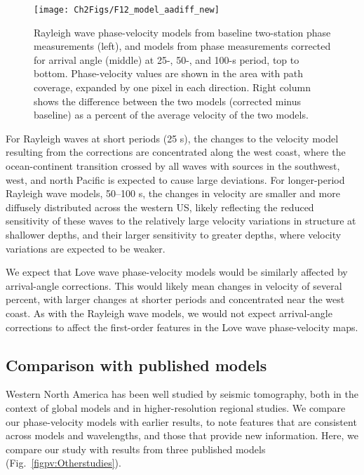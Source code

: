 \documentclass[12pt,oneside]{book}
\begin{document}
\begin{figure} 
\begin{center}
\texttt{[image: Ch2Figs/F12\_model\_aadiff\_new]} 
\caption[Comparison of Rayleigh wave phase-velocity maps from baseline and corrected two-station measurements]{Rayleigh wave phase-velocity models from baseline two-station phase measurements (left), and models from phase measurements corrected for arrival angle (middle) at 25-, 50-, and 100-s period, top to bottom. Phase-velocity values are shown in the area with path coverage, expanded by one pixel in each direction. Right column shows the difference between the two models (corrected minus baseline) as a percent of the average velocity of the two models. }
\label{figpv:pvmodels_R_aadiff}
\end{center}
\end{figure}
%

For Rayleigh waves at short periods (25 s), the changes to the velocity model resulting from the corrections are concentrated along the west coast, where the ocean-continent transition crossed by all waves with sources in the southwest, west, and north Pacific is expected to cause large deviations.  For longer-period Rayleigh wave models, 50\nobreakdash--100 s, the changes in velocity are smaller and more diffusely distributed across the western US, likely reflecting the reduced sensitivity of these waves to the relatively large velocity variations in structure at shallower depths, and their larger sensitivity to greater depths, where velocity variations are expected to be weaker.

We expect that Love wave phase-velocity models would be similarly affected by arrival-angle corrections. This would likely mean changes in velocity of several percent, with larger changes at shorter periods and concentrated near the west coast. As with the Rayleigh wave models, we would not expect arrival-angle corrections to affect the first-order features in the Love wave phase-velocity maps. 

\subsection{Comparison with published models}
Western North America has been well studied by seismic tomography, both in the context of global models and in higher-resolution regional studies. We compare our phase-velocity models with earlier results, to note features that are consistent across models and wavelengths, and those that provide new information. Here, we compare our study with results from three published models (Fig.~\ref{figpv:Otherstudies}). 
\end{document}
